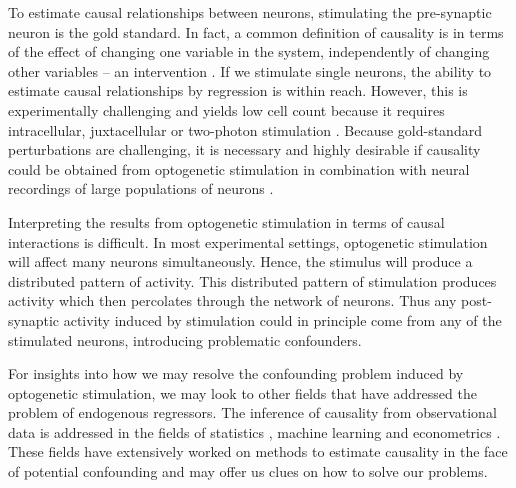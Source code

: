 \documentclass[11pt]{article}
\begin{document}
To estimate causal relationships between neurons, stimulating the pre-synaptic neuron is the gold standard. 
In fact, a common definition of causality is in terms of the effect of changing one variable in the system, independently of changing other variables -- an intervention \citep{pearl2009causality}. 
If we stimulate single neurons, the ability to estimate causal relationships by regression is within reach. 
However, this is experimentally challenging and yields low cell count because it requires intracellular, juxtacellular or two-photon stimulation \citep{pinault1996novel, lerman2017two, nikolenko2007two, emiliani2015all}. 
Because gold-standard perturbations are challenging, it is necessary and highly desirable if causality could be obtained from optogenetic stimulation in combination with neural recordings of large populations of neurons \citep{boyden2005millisecond, zemelman2002selective}.

Interpreting the results from optogenetic stimulation in terms of causal interactions is difficult. 
In most experimental settings, optogenetic stimulation will affect many neurons simultaneously. 
Hence, the stimulus will produce a distributed pattern of activity.
This distributed pattern of stimulation produces activity which then percolates through the network of neurons. 
Thus any post-synaptic activity induced by stimulation could in principle come from any of the stimulated neurons, introducing problematic confounders.

For insights into how we may resolve the confounding problem induced by optogenetic stimulation, we may look to other fields that have addressed the problem of endogenous regressors. 
The inference of causality from observational data is addressed in the fields of statistics \citep{pearl2009causality}, machine learning \citep{peters2017elements} and econometrics \citep{angrist2008mostly}. These fields have extensively worked on methods to estimate causality in the face of potential confounding and may offer us clues on how to solve our problems.
\end{document}
